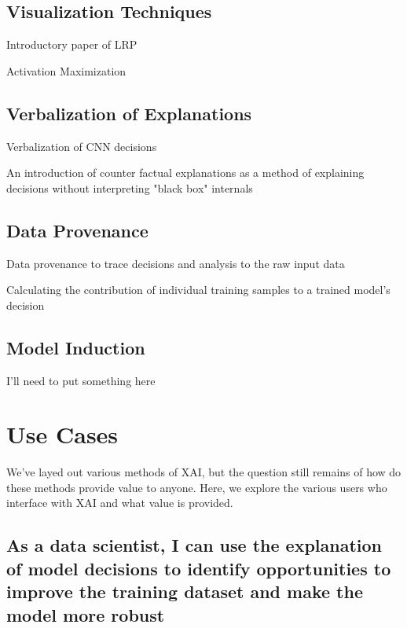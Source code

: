 \documentclass{IEEEtran}
\begin{document}
\subsection{Visualization Techniques}

Introductory paper of LRP \cite{10.1371/journal.pone.0130140}

Activation Maximization \cite{Nguyen2016}

\subsection{Verbalization of Explanations}
Verbalization of CNN decisions \cite{10.1007/978-3-319-46493-0_1}

An introduction of counter factual explanations as a method of explaining decisions without interpreting "black box" internals \cite{DBLP:journals/corr/abs-1711-00399}

\subsection{Data Provenance}

Data provenance to trace decisions and analysis to the raw input data

Calculating the contribution of individual training samples to a trained model's decision \cite{Ma2017}

\subsection{Model Induction}

I'll need to put something here

\section{Use Cases} \label{UseCases}

We've layed out various methods of XAI, but the question still remains of how do these methods provide value to anyone.  Here, we explore the various users who interface with XAI and what value is provided.

\subsection{As a data scientist, I can use the explanation of model decisions to identify opportunities to improve the training dataset and make the model more robust}
\end{document}
